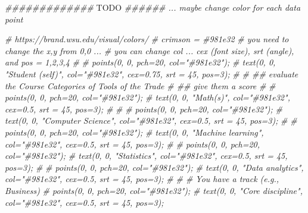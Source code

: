 \documentclass[
]{article}
\newenvironment{Shaded}{\begin{snugshade}}{\end{snugshade}}
\newcommand{\AlertTok}[1]{\textcolor[rgb]{0.94,0.16,0.16}{#1}}
\newcommand{\CommentTok}[1]{\textcolor[rgb]{0.56,0.35,0.01}{\textit{#1}}}
\begin{document}
\begin{Shaded}
\begin{Highlighting}[]
\CommentTok{\#\#\#\#\#\#\#\#\#\#\#\#\#  }\AlertTok{TODO}\CommentTok{ \#\#\#\#\#\# ... maybe change color for each data point}

\CommentTok{\# https://brand.wsu.edu/visual/colors/}
\CommentTok{\# crimson = \#981e32}
\CommentTok{\# you need to change the x,y from 0,0 ...}
\CommentTok{\# you can change col ... cex (font size), srt (angle), and pos = 1,2,3,4}
\CommentTok{\# }
\CommentTok{\# points(0, 0, pch=20, col="\#981e32");}
\CommentTok{\# text(0, 0, "Student (self)", col="\#981e32", cex=0.75, srt = 45, pos=3);}
\CommentTok{\# }
\CommentTok{\# \#\# evaluate the Course Categories of Tools of the Trade}
\CommentTok{\# \#\# give them a score}
\CommentTok{\# }
\CommentTok{\# points(0, 0, pch=20, col="\#981e32");}
\CommentTok{\# text(0, 0, "Math(s)", col="\#981e32", cex=0.5, srt = 45, pos=3);}
\CommentTok{\# }
\CommentTok{\# }
\CommentTok{\# points(0, 0, pch=20, col="\#981e32");}
\CommentTok{\# text(0, 0, "Computer Science", col="\#981e32", cex=0.5, srt = 45, pos=3);}
\CommentTok{\# }
\CommentTok{\# points(0, 0, pch=20, col="\#981e32");}
\CommentTok{\# text(0, 0, "Machine learning", col="\#981e32", cex=0.5, srt = 45, pos=3);}
\CommentTok{\# }
\CommentTok{\# points(0, 0, pch=20, col="\#981e32");}
\CommentTok{\# text(0, 0, "Statistics", col="\#981e32", cex=0.5, srt = 45, pos=3);}
\CommentTok{\# }
\CommentTok{\# points(0, 0, pch=20, col="\#981e32");}
\CommentTok{\# text(0, 0, "Data analytics", col="\#981e32", cex=0.5, srt = 45, pos=3);}
\CommentTok{\# }
\CommentTok{\# \# You have a track (e.g., Business)}
\CommentTok{\# points(0, 0, pch=20, col="\#981e32");}
\CommentTok{\# text(0, 0, "Core discipline", col="\#981e32", cex=0.5, srt = 45, pos=3);}
\end{Highlighting}
\end{Shaded}
\end{document}
